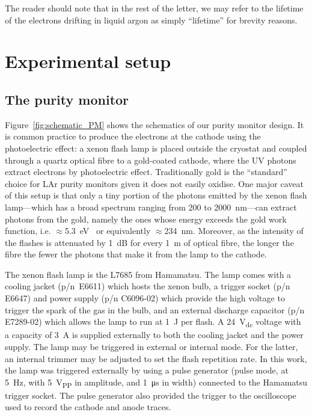 \documentclass[a4paper,11pt]{article}
\begin{document}
The reader should note that in the rest of the letter, we may refer to the lifetime of the electrons drifting in liquid argon as simply ``lifetime'' for brevity reasons. 

\section{Experimental setup}
\label{sec:experimental_setup}
\subsection{The purity monitor}

Figure~\ref{fig:schematic_PM} shows the schematics of our purity monitor design.
It is common practice to produce the electrons at the cathode using the photoelectric effect: a xenon flash lamp is placed outside the cryostat and coupled through a quartz optical fibre to a gold-coated cathode, where the UV photons extract electrons by photoelectric effect. Traditionally gold is the ``standard'' choice for LAr purity monitors given it does not easily oxidise.
One major caveat of this setup is that only a tiny portion of the photons emitted by the xenon flash lamp---which has a broad spectrum ranging from 200 to \SI{2000}{nm}---can extract photons from the gold, namely the ones whose energy exceeds the gold work function, i.e. $\approx$\SI{5.3}{\eV}~\cite{SACHTLER1966221} or equivalently $\approx$\SI{234}{nm}. Moreover, as the intensity of the flashes is attenuated by \SI{1}{\dB} for every \SI{1}{m} of optical fibre, the longer the fibre the fewer the photons that make it from the lamp to the cathode. 


The xenon flash lamp is the L7685 from Hamamatsu. The lamp comes with a cooling jacket (p/n~E6611) which hosts the xenon bulb, a trigger socket (p/n E6647) and power supply (p/n C6096-02) which provide the high voltage to trigger the spark of the gas in the bulb, and an external discharge capacitor (p/n E7289-02) which allows the lamp to run at \SI{1}{\joule} per flash. A \SI{24}{V_{dc}} voltage with a capacity of \SI{3}{A} is supplied externally to both the cooling jacket and the power supply. The lamp may be triggered in external or internal mode. For the latter, an internal trimmer may be adjusted to set the flash repetition rate. In this work, the lamp was triggered externally by using a pulse generator (pulse mode, at \SI{5}{Hz}, with \SI{5}{V_{PP}} in amplitude, and \SI{1}{\micro s} in width) connected to the Hamamatsu trigger socket. The pulse generator also provided the trigger to the oscilloscope used to record the cathode and anode traces. 
\end{document}
